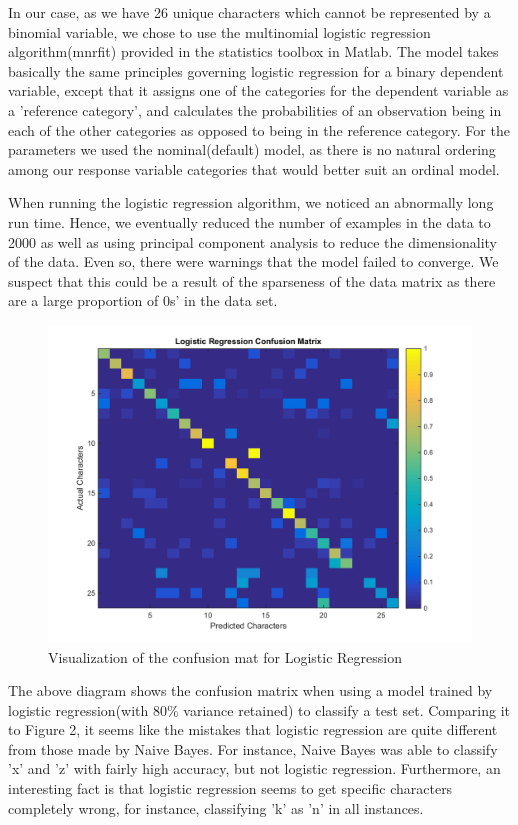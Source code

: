 \documentclass{article} %
\begin{document}
In our case, as we have 26 unique characters which cannot be represented by a binomial variable, we chose to use the multinomial logistic regression algorithm(mnrfit) provided in the statistics toolbox in Matlab. The model takes basically the same principles governing logistic regression for a binary dependent variable, except that it assigns one of the categories for the dependent variable as a 'reference category', and calculates the probabilities of an observation being in each of the other categories as opposed to being in the reference category. For the parameters we used the nominal(default) model, as there is no natural ordering among our response variable categories that would better suit an ordinal model.

When running the logistic regression algorithm, we noticed an abnormally long run time. Hence, we eventually reduced the number of examples in the data to 2000 as well as using principal component analysis to reduce the dimensionality of the data. Even so, there were warnings that the model failed to converge. We suspect that this could be a result of the sparseness of the data matrix as there are a large proportion of 0s' in the data set.

\begin{figure}[h]
\begin{center}
\includegraphics[scale=0.4]{confusion_lr.png}
\end{center}
\caption{Visualization of the confusion mat for Logistic Regression}
\end{figure}

The above diagram shows the confusion matrix when using a model trained by logistic regression(with 80\% variance retained) to classify a test set. Comparing it to Figure 2, it seems like the mistakes that logistic regression are quite different from those made by Naive Bayes. For instance, Naive Bayes was able to classify 'x' and 'z' with fairly high accuracy, but not logistic regression. Furthermore, an interesting fact is that logistic regression seems to get specific characters completely wrong, for instance, classifying 'k' as 'n' in all instances.
\end{document}
